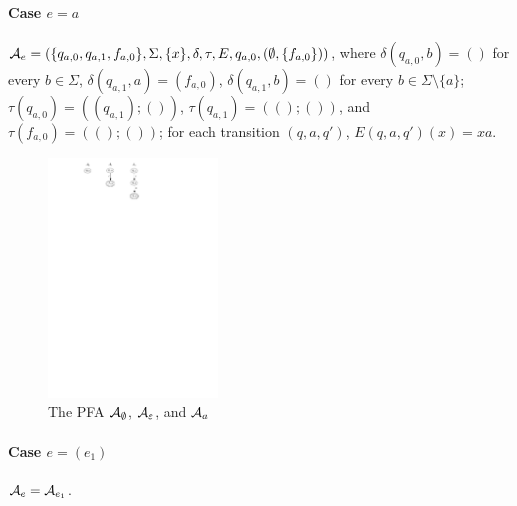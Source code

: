 \paragraph{Case $e = a$} $\mathcal{A}_e = (\{q_{a,0}, q_{a,1}, f_{a,0}\}, \Sigma, \{x\}, \delta, \tau, E, q_{a,0}, (\emptyset, \{f_{a,0}\}))$, where 
$\delta(q_{a,0}, b) = ()$ for every $b \in \Sigma$, $\delta(q_{a,1}, a) = (f_{a,0})$, $\delta(q_{a,1}, b) = ()$ for every $b \in \Sigma \setminus \{a\}$; 
%
$\tau(q_{a,0}) = ((q_{a,1}); ())$, $\tau(q_{a,1}) = ((); ())$, and $\tau(f_{a,0}) = ((); ())$; 
%
for each transition $(q, a, q')$, $E(q,a,q')(x) =xa$.
%		
\begin{figure}[ht]
			\centering
			\includegraphics[width = 0.4\textwidth]{reg2pfa-0.pdf}
			\caption{The PFA $\mathcal{A}_{\emptyset}$, $\mathcal{A}_{\varepsilon}$, and $\mathcal{A}_{a}$ }
			\label{fig-reg2pfa-0}
\end{figure}  

		
\paragraph{Case $e = (e_1)$} $\mathcal{A}_e = \mathcal{A}_{e_1}$.
		

